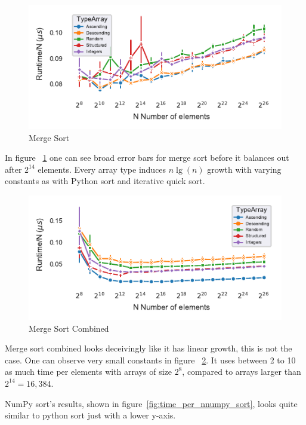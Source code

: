\documentclass[sigconf, nonacm, natbib, screen, balance=False]{acmart}
\begin{document}
\begin{figure}[]
  \centering
  \includegraphics[scale=0.75]{time_per_nmergesort.pdf}
  \caption{Merge Sort}
  \label{fig:time_per_nmergesort}
\end{figure}

In figure ~\ref{fig:time_per_nmergesort} one can see broad error bars for merge sort before it balances out after $2^{14}$ elements. Every array type induces $n\lg(n)$ growth with varying constants as with Python sort and iterative quick sort. 

\begin{figure}[]
  \centering
  \includegraphics[scale=0.75]{time_per_nmergesort_combined.pdf}
  \caption{Merge Sort Combined}
  \label{fig:time_per_nmergesort_combined}
\end{figure}

Merge sort combined looks deceivingly like it has linear growth, this is not the case. One can observe very small constants in figure ~\ref{fig:time_per_nmergesort_combined}. It uses between 2 to 10 as much time per elements with arrays of size $2^8$, compared to arrays larger than $2^{14}= 16,384$.

NumPy sort's results, shown in figure~\ref{fig:time_per_nnumpy_sort}, looks quite similar to python sort just with a lower y-axis. 
\end{document}
